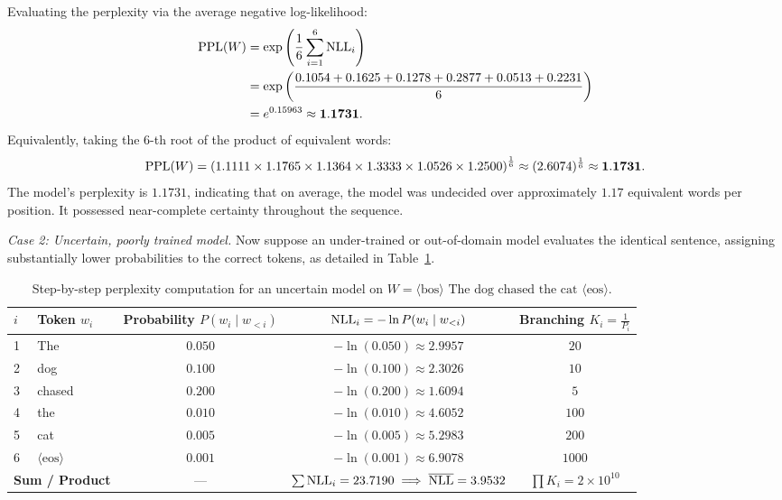\documentclass[../../main.tex]{subfiles}
\begin{document}
Evaluating the perplexity via the average negative log-likelihood:
\begin{align}
\mathrm{PPL}(W) &= \exp\left( \frac{1}{6} \sum_{i=1}^6 \mathrm{NLL}_i \right) \nonumber \\
        &= \exp\left( \frac{0.1054 + 0.1625 + 0.1278 + 0.2877 + 0.0513 + 0.2231}{6} \right) \nonumber \\
        &= e^{0.15963} \approx \mathbf{1.1731}.
\end{align}
Equivalently, taking the 6-th root of the product of equivalent words:
\begin{equation}
\mathrm{PPL}(W) = \left( 1.1111 \times 1.1765 \times 1.1364 \times 1.3333 \times 1.0526 \times 1.2500 \right)^{\frac{1}{6}} \approx (2.6074)^{\frac{1}{6}} \approx \mathbf{1.1731}.
\end{equation}
The model's perplexity is $1.1731$, indicating that on average, the model was undecided over approximately $1.17$ equivalent words per position. It possessed near-complete certainty throughout the sequence.

\textit{Case 2: Uncertain, poorly trained model.}
Now suppose an under-trained or out-of-domain model evaluates the identical sentence, assigning substantially lower probabilities to the correct tokens, as detailed in Table~\ref{tab:perplexity_uncertain_example}.

\begin{table}[htbp]
\centering
\small
\caption{Step-by-step perplexity computation for an uncertain model on $W = \langle\text{bos}\rangle \text{ The dog chased the cat } \langle\text{eos}\rangle$.}
\label{tab:perplexity_uncertain_example}
\begin{tabular}{llccc}
\toprule
$i$ & Token $w_i$ & Probability $P(w_i \mid w_{<i})$ & $\mathrm{NLL}_i = -\ln P(w_i \mid w_{<i})$ & Branching $K_i = \frac{1}{P_i}$ \\
\midrule
1 & The & $0.050$ & $-\ln(0.050) \approx 2.9957$ & $20$ \\
2 & dog & $0.100$ & $-\ln(0.100) \approx 2.3026$ & $10$ \\
3 & chased & $0.200$ & $-\ln(0.200) \approx 1.6094$ & $5$ \\
4 & the & $0.010$ & $-\ln(0.010) \approx 4.6052$ & $100$ \\
5 & cat & $0.005$ & $-\ln(0.005) \approx 5.2983$ & $200$ \\
6 & $\langle\text{eos}\rangle$ & $0.001$ & $-\ln(0.001) \approx 6.9078$ & $1000$ \\
\midrule
\multicolumn{2}{l}{\textbf{Sum / Product}} & --- & $\sum \mathrm{NLL}_i = 23.7190 \implies \overline{\mathrm{NLL}} = 3.9532$ & $\prod K_i = 2 \times 10^{10}$ \\
\bottomrule
\end{tabular}
\end{table}
\end{document}
